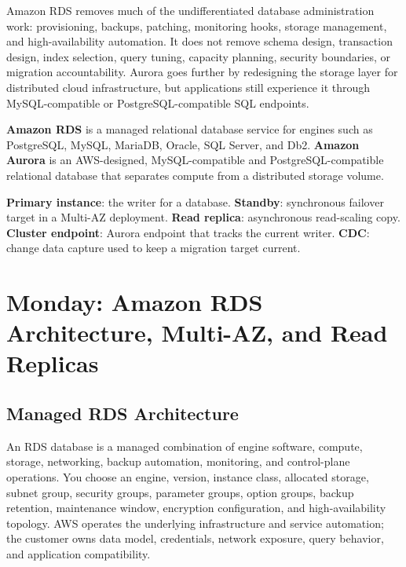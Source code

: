 Amazon RDS removes much of the undifferentiated database administration work: provisioning, backups, patching, monitoring hooks, storage management, and high-availability automation. It does not remove schema design, transaction design, index selection, query tuning, capacity planning, security boundaries, or migration accountability. Aurora goes further by redesigning the storage layer for distributed cloud infrastructure, but applications still experience it through MySQL-compatible or PostgreSQL-compatible SQL endpoints.

\begin{definitionbox}
\textbf{Amazon RDS} is a managed relational database service for engines such as PostgreSQL, MySQL, MariaDB, Oracle, SQL Server, and Db2. \textbf{Amazon Aurora} is an AWS-designed, MySQL-compatible and PostgreSQL-compatible relational database that separates compute from a distributed storage volume.
\end{definitionbox}

\begin{keyterms}
\textbf{Primary instance}: the writer for a database. \textbf{Standby}: synchronous failover target in a Multi-AZ deployment. \textbf{Read replica}: asynchronous read-scaling copy. \textbf{Cluster endpoint}: Aurora endpoint that tracks the current writer. \textbf{CDC}: change data capture used to keep a migration target current.
\end{keyterms}

\section{Monday: Amazon RDS Architecture, Multi-AZ, and Read Replicas}
\subsection{Managed RDS Architecture}
An RDS database is a managed combination of engine software, compute, storage, networking, backup automation, monitoring, and control-plane operations. You choose an engine, version, instance class, allocated storage, subnet group, security groups, parameter groups, option groups, backup retention, maintenance window, encryption configuration, and high-availability topology. AWS operates the underlying infrastructure and service automation; the customer owns data model, credentials, network exposure, query behavior, and application compatibility.

